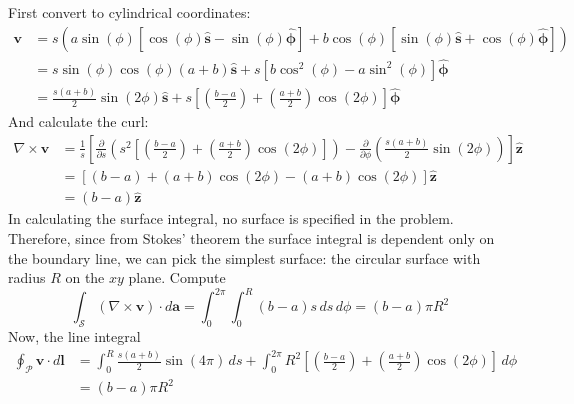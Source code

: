 \documentclass[a4paper]{article}
\begin{document}

First convert to cylindrical coordinates:
\begin{align*}
	\pmb{v} & = s \!\left( a \sin\!\left(\phi\right)\!\left[ \cos\!\left(\phi\right)\pmb{\hat{s}} - \sin\!\left(\phi\right)\pmb{\hat{\phi}} \right] + b \cos\!\left(\phi\right)\!\left[ \sin\!\left(\phi\right)\pmb{\hat{s}} + \cos\!\left(\phi\right)\pmb{\hat{\phi}} \right] \right) \\
		& = s \sin\!\left(\phi\right)\cos\!\left(\phi\right)\!\left( a + b \right)\pmb{\hat{s}} + s \!\left[ b \cos^{2}\!\left(\phi\right) - a \sin^{2}\!\left(\phi\right) \right]\pmb{\hat{\phi}} \\
		& = \frac{s \!\left( a + b \right)}{2}\sin\!\left(2 \phi\right)\pmb{\hat{s}} + s \!\left[ \!\left( \frac{b - a}{2} \right) + \!\left( \frac{a + b}{2} \right)\cos\!\left(2 \phi\right) \right]\pmb{\hat{\phi}}
\end{align*}
And calculate the curl:
\begin{align*}
	\nabla \times \pmb{v} & = \frac{1}{s}\!\left[ \frac{\partial }{\partial s}\!\left( s^{2}\!\left[ \!\left( \frac{b - a}{2} \right) + \!\left( \frac{a + b}{2} \right)\cos\!\left(2 \phi\right) \right] \right) - \frac{\partial }{\partial \phi}\!\left( \frac{s \!\left( a + b \right)}{2}\sin\!\left(2 \phi\right) \right) \right]\pmb{\hat{z}} \\
			      & = \!\left[ \!\left( b - a \right) + \!\left( a +  b \right)\cos\!\left(2 \phi\right) - \!\left( a + b \right)\cos\!\left(2 \phi\right) \right]\pmb{\hat{z}} \\
			      & = \!\left( b - a \right)\pmb{\hat{z}}
\end{align*}
In calculating the surface integral, no surface is specified in the problem. Therefore, since from Stokes' theorem the surface integral is dependent only on the boundary line, we can pick the simplest surface: the circular surface with radius \( R \) on the \( xy \) plane. Compute
\[
	\int_{\mathcal{S}} \!\left( \nabla \times \pmb{v} \right) \cdot d \pmb{a} = \int^{2 \pi}_{0} \int^{R}_{0} \!\left( b - a \right)s \, ds \, d \phi = \!\left( b - a \right)\pi R^{2}
\]
Now, the line integral
\begin{align*}
	\oint_{\mathcal{P}} \pmb{v} \cdot d \pmb{l} & = \int^{R}_{0} \frac{s \!\left( a + b \right)}{2}\sin\!\left(4 \pi\right) \, ds + \int^{2 \pi}_{0} R^{2}\!\left[ \!\left( \frac{b - a}{2} \right) + \!\left( \frac{a + b}{2} \right)\cos\!\left(2 \phi\right) \right] \, d \phi \\
	 & = \!\left( b - a \right)\pi R^{2}
\end{align*}
\end{document}
